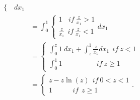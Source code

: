 \begin{ex}
\begin{enumerate}
\[\begin{split}
\begin{cases}
		\end{cases}dx_1\\
		&=\int_{0}^{1}
		\begin{cases}
		1 \ \ \ \  if \ \frac{z}{x_1}>1 \\
		\frac{z}{x_1} \ \  if \  \frac{z}{x_1}<1
		\end{cases}dx_1\\
		&=\begin{cases}
		\int_{0}^{z}1\ dx_1+ \int_{z}^{1} \frac{z}{x_1} dx_1 \ \  if  \ z<1 \\
		\int_0^1 1 \ \ \ \ \ \ \ \ \ \ \ \ \ \ \ \ \ \ \ \ \ \ if \ z \geq 1
		\end{cases}\\
		&=\begin{cases}
		z-z\ln(z) \  \   if \  0<z<1\\
		1 \ \ \ \ \ \ \ \ \ \ \ \ \ if \ \ z\geq 1
		\end{cases}.
		\end{split}
		\]
	\end{enumerate}
\end{ex}

